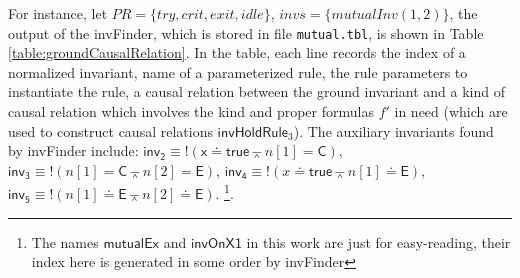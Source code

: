 \documentclass[final]{IEEEtran}
\def \eqc {\doteq }
\def \andc {\barwedge }
\def \negc {!}
\begin{document}

For instance, let $PR=\{try, crit, exit, idle\}$, $invs=\{mutualInv(1,2)\}$,    the output of the {\sf invFinder}, which is stored in file {\tt mutual.tbl},  is shown in Table
\ref{table:groundCausalRelation}. In the table,  each line records the    index of a normalized   invariant, name of a parameterized rule, the rule
  parameters to instantiate the rule, a causal relation between
  the ground invariant and a kind of causal relation which involves the kind and proper formulas
  $f'$   in need (which are used to construct
      causal relations $\mathsf{invHoldRule}_3$). The auxiliary invariants found by {\sf invFinder} include: $\mathsf{inv_2}  \equiv  \negc (\mathsf{x} \eqc \mathsf{true}  \andc  n[1]=\mathsf{C})$, $\mathsf{inv_3}    \equiv \negc  ( n[1]=\mathsf{C} \andc n[2]=\mathsf{E})$,
$\mathsf{inv_4}  \equiv  \negc (x \eqc \mathsf{true}  \andc  n[1]\eqc \mathsf{E})$,   $\mathsf{inv_5}    \equiv \negc  ( n[1]\eqc \mathsf{E} \andc n[2] \eqc \mathsf{E})$.  \footnote{The names $\mathsf{mutualEx}$ and $\mathsf{invOnX1}$ in
  this work are just for easy-reading, their
 index here is generated  in some order by {\sf invFinder}}.


\end{document}
